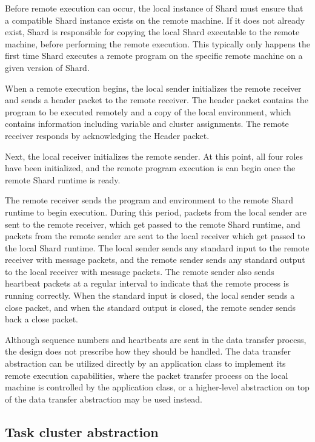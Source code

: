 \documentclass[twoside]{report}
\begin{document}
Before remote execution can occur, the local instance of Shard must ensure that a compatible Shard instance exists on the remote machine.
If it does not already exist, Shard is responsible for copying the local Shard executable to the remote machine, before performing the remote execution.
This typically only happens the first time Shard executes a remote program on the specific remote machine on a given version of Shard.

When a remote execution begins, the local sender initializes the remote receiver and sends a header packet to the remote receiver.
The header packet contains the program to be executed remotely and a copy of the local environment, which contains information including variable and cluster assignments.
The remote receiver responds by acknowledging the Header packet.

Next, the local receiver initializes the remote sender.
At this point, all four roles have been initialized, and the remote program execution is can begin once the remote Shard runtime is ready.

The remote receiver sends the program and environment to the remote Shard runtime to begin execution.
During this period, packets from the local sender are sent to the remote receiver, which get passed to the remote Shard runtime, and packets from the remote sender are sent to the local receiver which get passed to the local Shard runtime.
The local sender sends any standard input to the remote receiver with message packets, and the remote sender sends any standard output to the local receiver with message packets.
The remote sender also sends heartbeat packets at a regular interval to indicate that the remote process is running correctly.
When the standard input is closed, the local sender sends a close packet, and when the standard output is closed, the remote sender sends back a close packet.

Although sequence numbers and heartbeats are sent in the data transfer process, the design does not prescribe how they should be handled.
The data transfer abstraction can be utilized directly by an application class to implement its remote execution capabilities, where the packet transfer process on the local machine is controlled by the application class, or a higher-level abstraction on top of the data transfer abstraction may be used instead.

\subsection{Task cluster abstraction}
\end{document}
